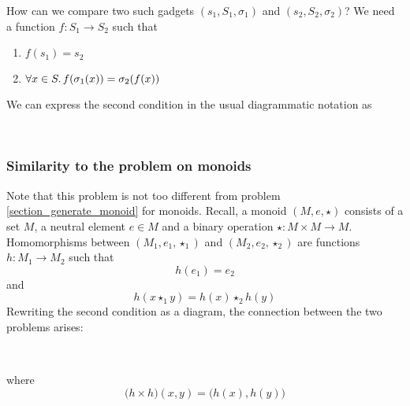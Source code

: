 How can we compare two such gadgets $(s_1, S_1, \sigma_1)$ and $(s_2, S_2, \sigma_2)$?
We need a function $f: S_1 \to S_2$ such that
\begin{enumerate}
    \item $f(s_1) = s_2$
    \item $\forall x \in S \ldotp f(\sigma_1(x)) = \sigma_2(f(x))$
\end{enumerate}
We can express the second condition in the usual diagrammatic notation as
    \begin{center}
         \\[3mm]
    \end{center}

\subsubsection{Similarity to the problem on monoids}

Note that this problem is not too different from problem
\ref{section_generate_monoid} for monoids. Recall, a monoid $(M, e, \star)$
consists of a set $M$, a neutral
element $e \in M$ and a binary operation $\star: M\times M \to M$.
Homomorphisms between $(M_1,e_1,\star_1)$ and $(M_2,e_2,\star_2)$ are
functions $h: M_1 \to M_2$ such that \[ h(e_1) = e_2 \]
and
    \[ h(x \star_1 y) = h(x) \star_2 h(y) \]
Rewriting the second condition as a diagram, the connection between the two
problems arises:
\begin{center}
     \\[3mm]
\end{center}
where
\[\big(h \times h\big)(x,y) = \big(h(x), h(y)\big)\]

